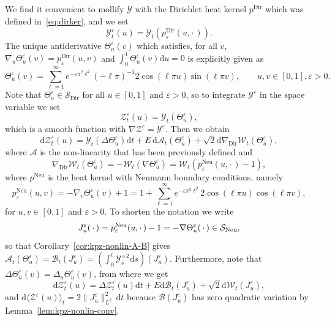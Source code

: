 \documentclass[AHL,Unicode,longabstracts]{cedram}
\DeclareMathOperator{\Dir}{Dir}
\DeclareMathOperator{\Neu}{Neu}
\newcommand{\mc}[1]{{\mathcal #1}}
\renewcommand{\mc}[1]{{\mathcal #1}}
\newcommand{\Ctwo}{\ensuremath{\mc S_{\Dir}}}
\newcommand*{\dd}{\mathrm{d}}
\newcommand*{\ds}{\dd s}
\newcommand*{\dt}{\dd t}
\newcommand*{\du}{\dd u}
\begin{document}
We find it convenient to mollify $\mc Y$ with the Dirichlet heat kernel $p^{\Dir}$ which was defined in~\eqref{eq:dirker}, and we set
\[
\mc Y^{\varepsilon}_t (u) = \mc Y_t (p^{\Dir}_{\varepsilon} (u,
\cdot\,)).
\]
The unique antiderivative $\Theta^\varepsilon_u(v)$ which satisfies, for all $v$, $\nabla_u \Theta^\varepsilon_u(v) = p^{\Dir}_{\varepsilon} (u,v)$ and $\int_0^1 \Theta^\varepsilon_u(v)\du = 0$ is explicitly given as
\[
\Theta^{\varepsilon}_u (v)= \sum_{\ell = 1}^{\infty} e^{-
\varepsilon \pi^2 \ell^2} (- \ell \pi)^{- 1} 2 \cos (\ell \pi u) \sin (\ell
\pi v), \qquad u,v \in [0,1], \varepsilon > 0.
\]
Note that $\Theta^\varepsilon_u \in \Ctwo$ for all $u \in [0,1]$ and $\varepsilon > 0$, so to integrate $\mc Y^\varepsilon$ in the space variable we set
\[
\mc Z^{\varepsilon}_t (u) = \mc Y_t (\Theta^{\varepsilon}_u),
\]
which is a smooth function with $\nabla \mc Z^{\varepsilon} = \mc Y^{\varepsilon}$. Then we obtain
\[
\dd\mc Z^{\varepsilon}_t (u) = \mc Y_t (\Delta \Theta^{\varepsilon}_u) \dt + E\,\dd \mathcal{A}_t (\Theta^{\varepsilon}_u) + \sqrt2 \dd \mc \nabla_{\Dir} \mc W_t (\Theta^{\varepsilon}_u),
\]
where $\mc A$ is the non-linearity that has been previously defined and
\[
\nabla_{\Dir} \mc W_t (\Theta^{\varepsilon}_u) = - \mc W_t (\nabla \Theta^\varepsilon_u) = \mc W_t (p^{\Neu}_{\varepsilon} (u, \cdot\,) - 1),
\]
where $p^{\Neu}$ is the heat kernel with Neumann boundary conditions, namely
\begin{equation}\label{eq:neuker}
p^{\Neu}_{\varepsilon} (u, v) = - \nabla_v \Theta^{\varepsilon}_u (v) + 1
= 1 + \sum_{\ell = 1}^{\infty} e^{- \varepsilon \pi^2 \ell^2} 2 \cos (\ell \pi u) \cos (\ell \pi v),
\end{equation}
for $u,v\in[0,1]$ and $\varepsilon > 0$. To shorten the notation we write
\[
J^{\varepsilon}_u ({\,\cdot\,}) = p^{\Neu}_{\varepsilon} (u, \cdot\,) - 1 = - \nabla
\Theta^{\varepsilon}_u ({\,\cdot\,}) \in \mc S_{\rm{Neu}},
\]
so that Corollary~\ref{cor:kpz-nonlin-A-B} gives $\mathcal{A}_t (\Theta^{\varepsilon}_u) = \mathcal{B}_t(J^{\varepsilon}_u) = (\int_0^t
\mc Y_s^{\diamond 2} \ds)(J^\varepsilon_u)$. Furthermore, note that $\Delta \Theta^{\varepsilon}_u (v) = \Delta_u \Theta_u^{\varepsilon} (v)$, from where we get
\[
\dd\mc Z^{\varepsilon}_t (u) = \Delta \mc Z^{\varepsilon}_t (u) \dt + E \dd \mathcal{B}_t (J^{\varepsilon}_u) + \sqrt{2} \dd\mc W_t (J^{\varepsilon}_u),
\]
and $\dd \langle \mc Z^{\varepsilon} (u) \rangle_t = 2 \| J^{\varepsilon}_u \|_{L^2}^2 \,\dt$ because $\mc B(J^\varepsilon_u)$ has zero quadratic variation by Lem\-ma~\ref{lem:kpz-nonlin-conv}.
\end{document}
